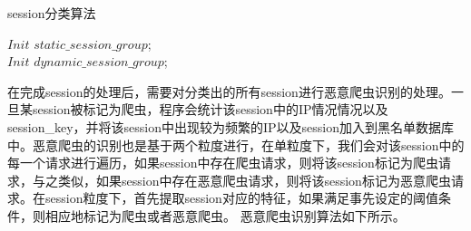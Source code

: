 \documentclass[doctor,privacy,twoside]{buaa_mac}
\begin{document}
\begin{algorithm}[!h]
  \caption{session分类算法}
  

$Init$  $static\_{}session\_{}group$;\\
$Init$  $dynamic\_{}session\_{}group$;\\

 
\end{algorithm}

在完成session的处理后，需要对分类出的所有session进行恶意爬虫识别的处理。一旦某session被标记为爬虫，程序会统计该session中的IP情况情况以及session\_{}key，并将该session中出现较为频繁的IP以及session加入到黑名单数据库中。恶意爬虫的识别也是基于两个粒度进行，在单粒度下，我们会对该session中的每一个请求进行遍历，如果session中存在爬虫请求，则将该session标记为爬虫请求，与之类似，如果session中存在恶意爬虫请求，则将该session标记为恶意爬虫请求。在session粒度下，首先提取session对应的特征，如果满足事先设定的阈值条件，则相应地标记为爬虫或者恶意爬虫。 恶意爬虫识别算法如下所示。
\end{document}
